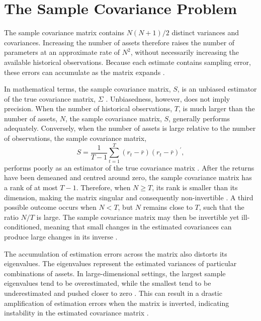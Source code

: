 \section{The Sample Covariance Problem}

The sample covariance matrix contains \(N(N+1)/2\) distinct variances and covariances. Increasing the number of assets therefore raises the number of parameters at an approximate rate of \(N^2\), without necessarily increasing the available historical observations. Because each estimate contains sampling error, these errors can accumulate as the matrix expands \parencite[378]{ledoit2004well}.

In mathematical terms, the sample covariance matrix, \(S\), is an unbiased estimator of the true covariance matrix, \(\Sigma\) \parencite[368]{ledoit2004well}. Unbiasedness, however, does not imply precision. When the number of historical observations, \(T\), is much larger than the number of assets, \(N\), the sample covariance matrix, \(S\), generally performs adequately. Conversely, when the number of assets is large relative to the number of observations, the sample covariance matrix,
\[
S=\frac{1}{T-1}\sum_{t=1}^{T}(r_t-\bar r)(r_t-\bar r)^{\prime},
\]
performs poorly as an estimator of the true covariance matrix \parencite[366]{ledoit2004well}. After the returns have been demeaned and centred around zero, the sample covariance matrix has a rank of at most \(T-1\). Therefore, when \(N\geq T\), its rank is smaller than its dimension, making the matrix singular and consequently non-invertible \parencite[604]{LEDOIT2003603}. A third possible outcome occurs when \(N<T\), but \(N\) remains close to \(T\), such that the ratio \(N/T\) is large. The sample covariance matrix may then be invertible yet ill-conditioned, meaning that small changes in the estimated covariances can produce large changes in its inverse \parencite[366]{ledoit2004well}.

The accumulation of estimation errors across the matrix also distorts its eigenvalues. The eigenvalues represent the estimated variances of particular combinations of assets. In large-dimensional settings, the largest sample eigenvalues tend to be overestimated, while the smallest tend to be underestimated and pushed closer to zero \parencite[372]{ledoit2004well}. This can result in a drastic amplification of estimation errors when the matrix is inverted, indicating instability in the estimated covariance matrix \parencite[614]{LEDOIT2003603}.

